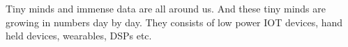 \documentclass[../../main]{subfiles}
\begin{document}

Tiny minds and immense data are all around us. And these tiny minds are growing in
numbers day by day. They consists of low power IOT devices, hand held devices, wearables,
DSPs etc.

\end{document}
